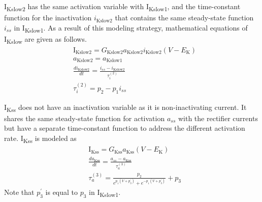 \documentclass[11pt]{article}
\begin{document}
I\textsubscript{Kslow2} has the same activation variable with I\textsubscript{Kslow1}, and the time-constant function for the inactivation $i_{\mathrm{Kslow2}}$ that contains the same steady-state function $i_{ss}$ in I\textsubscript{Kslow1}. As a result of this modeling strategy, mathematical equations of I\textsubscript{Kslow} are given as follows. 
\begin{align}
    &\mathrm{I}_{\mathrm{Kslow2}} = G_{\mathrm{Kslow2}}a_{\mathrm{Kslow2}}i_{\mathrm{Kslow2}}(V-E_{\mathrm{K}}) \\
    &a_{\mathrm{Kslow2}} = a_{\mathrm{Kslow1}} \\
    &\frac{di_{\mathrm{Kslow2}}}{dt} = \frac{i_{ss}-i_{\mathrm{Kslow2}}}{\tau_{i}^{(2)}} \\
    &\tau_{i}^{(2)} = p_{2} - p_{1}i_{ss}
\end{align}

I\textsubscript{Kss} does not have an inactivation variable as it is non-inactivating current. It shares the same steady-state function for activation $a_{ss}$ with the rectifier currents but have a separate time-constant function to address the different activation rate. I\textsubscript{Kss} is modeled as
\begin{align}
    &\mathrm{I}_{\mathrm{Kss}} = G_{\mathrm{Kss}}a_{\mathrm{Kss}}(V-E_{\mathrm{K}}) \\
    &\frac{da_{\mathrm{Kss}}}{dt} = \frac{a_{ss}-a_{\mathrm{Kss}}}{\tau_{a}^{(3)}} \\
    &\tau_{a}^{(3)}= \frac{p_{2}}{e^{p_{1}(V+p_{3}^\prime)}+e^{-p_{1}(V+p_{3}^\prime)}} + p_{3}
\end{align}
Note that $p_{3}^\prime$ is equal to $p_{3}$ in I\textsubscript{Kslow1}.
\end{document}
